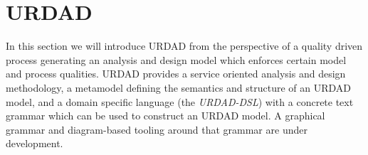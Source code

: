 \section{URDAD}
\label{sec:urdad}

In this section we will introduce URDAD from the perspective of a quality driven process generating an analysis and design model which enforces certain model and process qualities.  URDAD\cite{solms_generating_2009} provides a service oriented analysis and design methodology, a metamodel defining the semantics and structure of an URDAD model, and a domain specific language (the \emph{URDAD-DSL}) with a concrete text grammar which can be used to construct an URDAD model. A graphical grammar and diagram-based tooling around that grammar are under development. 



 